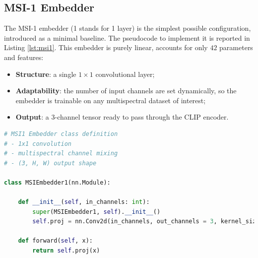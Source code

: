 \documentclass[a4paper, oneside, english]{sapthesis} %
\begin{document}

\subsection{MSI-1 Embedder}

The MSI-1 embedder (1 stands for 1 layer) is the simplest possible configuration, introduced as a minimal baseline. The pseudocode to implement it is reported in Listing \ref{lst:msi1}. This embedder is purely linear, accounts for only $42$ parameters and features:

\begin{itemize}
    \item \textbf{Structure}: a single $1\times1$ convolutional layer;
    \item \textbf{Adaptability}: the number of input channels are set dynamically, so the embedder is trainable on any multispectral dataset of interest;
    \item \textbf{Output}: a 3-channel tensor ready to pass through the CLIP encoder.
\end{itemize}

\vspace{-0.3cm}

\begin{lstlisting}[language=Python, caption={MSI-1 Embedder implemented in Pytorch.}, label={lst:msi1}]
# MSI1 Embedder class definition
# - 1x1 convolution
# - multispectral channel mixing
# - (3, H, W) output shape

class MSIEmbedder1(nn.Module):

    def __init__(self, in_channels: int):
        super(MSIEmbedder1, self).__init__()
        self.proj = nn.Conv2d(in_channels, out_channels = 3, kernel_size = 1)

    def forward(self, x):
        return self.proj(x) 
\end{lstlisting}
\end{document}
